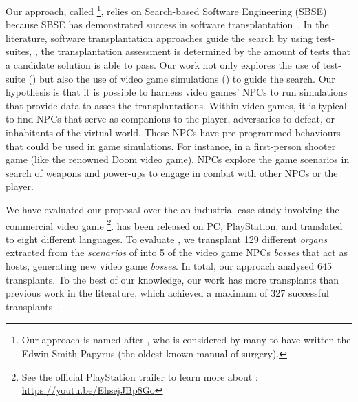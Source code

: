 
Our approach, called \ApproachName{}\footnote{Our approach is named after \ApproachName{}, who is considered by many to have written the Edwin Smith Papyrus (the oldest known manual of surgery).}, relies on Search-based Software Engineering (SBSE) because SBSE has demonstrated success in software transplantation~\cite{barr2015automated}. In the literature, software transplantation approaches guide the search by using test-suites, \ie, the transplantation assessment is determined by the amount of tests that a candidate solution is able to pass. Our work not only explores the use of test-suite (\timhotep{}) but also the use of video game simulations (\simhotep{}) to guide the search.  Our hypothesis is that it is possible to harness video games' NPCs to run simulations that provide data to asses the transplantations. Within video games, it is typical to find NPCs that serve as companions to the player, adversaries to defeat, or inhabitants of the virtual world. These NPCs have pre-programmed behaviours that could be used in game simulations. For instance, in a first-person shooter game (like the renowned Doom video game), NPCs explore the game scenarios in search of weapons and power-ups to engage in combat with other NPCs or the player.

We have evaluated our proposal over the an industrial  case study involving the commercial video game \CaseStudy{}\footnote{See the official PlayStation trailer to learn more about \CaseStudy{}: \url{https://youtu.be/EhsejJBp8Go}}. \CaseStudy{} has been released on PC, PlayStation, and translated to eight different languages.
To evaluate \ApproachName{}, we transplant 129 different \textit{organs} extracted from the \textit{scenarios} of \CaseStudy{} into 5 of the video game NPCs \textit{bosses} that act as hosts, generating new video game \textit{bosses}. 
In total, our approach analysed 645 transplants. To the best of our knowledge, our work has more transplants than previous work in the literature, which achieved a maximum of 327 successful transplants~\cite{reid2020optimising}. 

